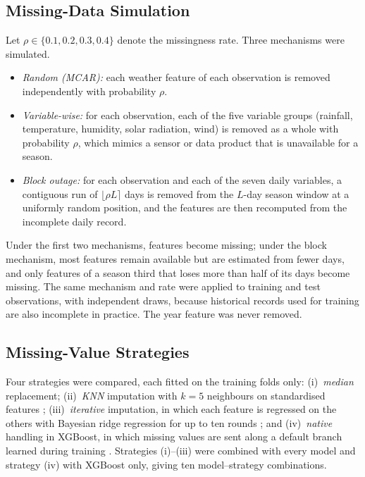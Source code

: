 \subsection{Missing-Data Simulation}

Let $\rho \in \{0.1, 0.2, 0.3, 0.4\}$ denote the missingness rate. Three mechanisms were simulated.
\begin{itemize}
\item \emph{Random (MCAR):} each weather feature of each observation is removed independently with
probability $\rho$.
\item \emph{Variable-wise:} for each observation, each of the five variable groups (rainfall,
temperature, humidity, solar radiation, wind) is removed as a whole with probability $\rho$,
which mimics a sensor or data product that is unavailable for a season.
\item \emph{Block outage:} for each observation and each of the seven daily variables, a contiguous
run of $\lfloor \rho L \rceil$ days is removed from the $L$-day season window at a uniformly random
position, and the features are then recomputed from the incomplete daily record.
\end{itemize}
Under the first two mechanisms, features become missing; under the block mechanism, most features
remain available but are estimated from fewer days, and only features of a season third that loses
more than half of its days become missing. The same mechanism and rate were applied to training and
test observations, with independent draws, because historical records used for training are also
incomplete in practice. The year feature was never removed.

\subsection{Missing-Value Strategies}

Four strategies were compared, each fitted on the training folds only: (i)~\emph{median}
replacement; (ii)~\emph{KNN} imputation with $k = 5$ neighbours on standardised features
\cite{troyanskaya2001}; (iii)~\emph{iterative} imputation, in which each feature is regressed on
the others with Bayesian ridge regression for up to ten rounds \cite{vanbuuren2011}; and
(iv)~\emph{native} handling in XGBoost, in which missing values are sent along a default branch
learned during training \cite{chen2016}. Strategies (i)--(iii) were combined with every model and
strategy (iv) with XGBoost only, giving ten model--strategy combinations.

